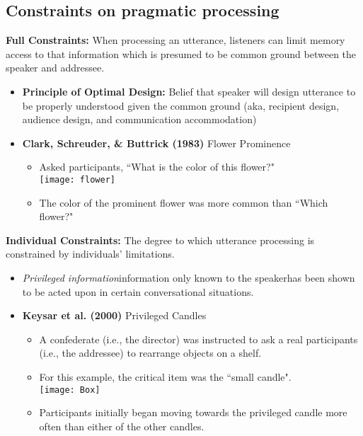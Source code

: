 \documentclass{article}
\begin{document}
\begin{multicols}{2}
\subsection{Constraints on pragmatic processing}
\textbf{Full Constraints:} When processing an utterance, listeners can limit memory access to that information which is presumed to be common ground between the speaker and addressee. 
\begin{itemize}
	\item \textbf{Principle of Optimal Design:} Belief that speaker will design utterance to be properly understood given the common ground (aka, recipient design, audience design, and communication accommodation)
	\item \textbf{Clark, Schreuder, \& Buttrick (1983)} Flower Prominence
	\begin{itemize}
		\item Asked participants, \textquotedblleft What is the color of this flower?"\\ \vspace{3mm}
		\hspace{2mm}\texttt{[image: flower]}
		\item The color of the prominent flower was more common than \textquotedblleft Which flower?"
	\end{itemize} 
\end{itemize}
\textbf{Individual Constraints:} The degree to which utterance processing is constrained by individuals' limitations.
\begin{itemize}
	\item \textit{Privileged information}\textemdash information only known to the speaker\textemdash has been shown to be acted upon in certain conversational situations.
	\item \textbf{Keysar et al. (2000)} Privileged Candles
	\begin{itemize}
		\item A confederate (i.e., the director) was instructed to ask a real participants (i.e., the addressee) to rearrange objects on a shelf.
		\item For this example, the critical item was the \textquotedblleft small candle".\\\vspace{2mm}
		\hspace{10mm}\texttt{[image: Box]}
		\item Participants initially began moving towards the privileged candle more often than either of the other candles.

\end{itemize}
\end{itemize}
\end{multicols}
\end{document}
